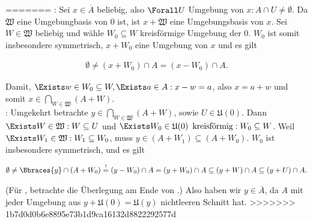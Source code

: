 \begin{solution}
\begin{itemize}
\end{itemize}
=======
\Quote{$\subseteq$}:
Sei $x \in \overline{A}$ beliebig, also $\Forall U$ Umgebung von $x: A \cap U \neq \emptyset$.
Da $\mathfrak{W}$ eine Umgebungbasis von $0$ ist, ist $x + \mathfrak{W}$ eine Umgebungsbasis von $x$.
Sei $W \in \mathfrak{W}$ beliebig und wähle $W_0 \subseteq W$ kreisförmige Umgebung der $0$.
$W_0$ ist somit insbesondere symmetrisch, $x + W_0$ eine Umgebung von $x$ und es gilt

\begin{align*}
  \emptyset
  \neq
  (x + W_0) \cap A
  =
  (x - W_0) \cap A.
\end{align*}

Damit, $\Exists w \in W_0 \subseteq W, \Exists a \in A: x - w = a$, also $x = a + w$ und somit $x \in \bigcap_{W \in \mathfrak{W}}(A + W)$. \\

\Quote{$\supseteq$}:
Umgekehrt betrachte $y \in \bigcap_{W \in \mathfrak{W}}(A + W)$, sowie $ U \in \mathfrak{U}(0)$.
Dann $\Exists W \in \mathfrak{W}: W \subseteq U$ und $\Exists W_0 \in \mathfrak{U}(0) \enspace \text{kreisförmig}: W_0 \subseteq W$.
Weil $\Exists W_1 \in \mathfrak{W}: W_1 \subseteq W_0$, muss $y \in (A + W_1) \subseteq (A + W_0)$.
$W_0$ ist insbesondere symmetrisch, und es gilt

\begin{align*}
  \emptyset
  \neq
  \Bbraces{y} \cap (A + W_0)
  \stackrel{!}{=}
  (y - W_0) \cap A = (y + W_0) \cap A
  \subseteq
  (y + W) \cap A
  \subseteq
  (y + U) \cap A.
\end{align*}

(Für \Quote{!}, betrachte die Überlegung am Ende von \Quote{$\subseteq$}.)
Also haben wir $y \in \overline{A}$, da $A$ mit jeder Umgebung aus $y + \mathfrak{U}(0) = \mathfrak{U}(y)$ nichtleeren Schnitt hat.
>>>>>>> 1b7d0d0b6e8895e73b1d9ca16132d8822292577d

\end{solution}
